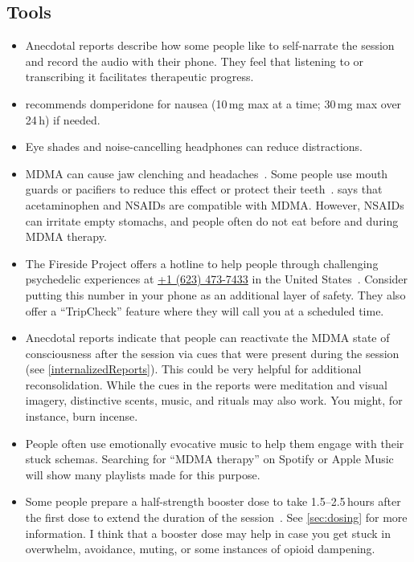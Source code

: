 \documentclass[11pt,oneside]{book}
\let\cite\parencite
\begin{document}
\subsection*{Tools}
\begin{itemize}
    \item Anecdotal reports describe how some people like to self-narrate the session and record the audio with their phone. They feel that listening to or transcribing it facilitates therapeutic progress.
    \item \textcite{liechtiInteractions} recommends domperidone for nausea (10\,mg max at a time; 30\,mg max over 24\,h) if needed.
    \item Eye shades and noise-cancelling headphones can reduce distractions.
    \item MDMA can cause jaw clenching and headaches~\cite{mitchellMDMAClinicalTrial2,liechtiGender}. Some people use mouth guards or pacifiers to reduce this effect or protect their teeth~\cite{emdeEmergency}. \textcite{liechtiInteractions} says that acetaminophen and NSAIDs are compatible with MDMA. However, NSAIDs can irritate empty stomachs, and people often do not eat before and during MDMA therapy.
    \item The Fireside Project offers a hotline to help people through challenging psychedelic experiences at \href{tel:1-623-473-7433}{+1 (623) 473-7433} in the United States~\cite{firesideProject}. Consider putting this number in your phone as an additional layer of safety. They also offer a \enquote{TripCheck} feature where they will call you at a scheduled time.
    \item Anecdotal reports indicate that people can reactivate the MDMA state of consciousness after the session via cues that were present during the session (see \cref{internalizedReports}). This could be very helpful for additional reconsolidation. While the cues in the reports were meditation and visual imagery, distinctive scents, music, and rituals may also work. You might, for instance, burn incense.
    \item People often use emotionally evocative music to help them engage with their stuck schemas. Searching for \enquote{MDMA therapy} on Spotify or Apple Music will show many playlists made for this purpose.
    \item Some people prepare a half-strength booster dose to take 1.5--2.5\,hours after the first dose to extend the duration of the session~\cite{mitchellMDMAClinicalTrial2}. See \cref{sec:dosing} for more information. I think that a booster dose may help in case you get stuck in overwhelm, avoidance, muting, or some instances of opioid dampening.
\end{itemize}
\end{document}
